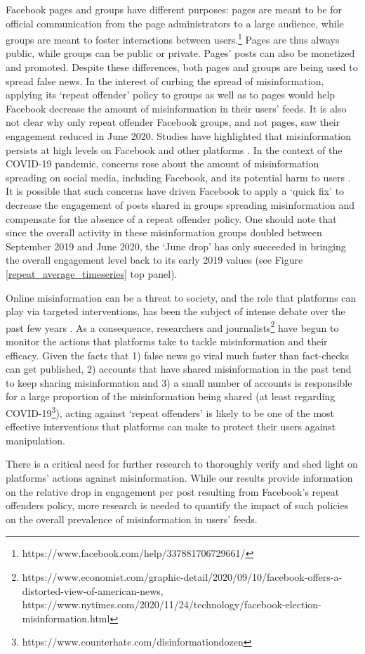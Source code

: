 \documentclass[11pt,a4paper]{article}
\begin{document}
Facebook pages and groups have different purposes: pages are meant to be for official communication from the page administrators to a large audience, while groups are meant to foster interactions between users.\footnote{https://www.facebook.com/help/337881706729661/} 
Pages are thus always public, while groups can be public or private.
Pages' posts can also be monetized and promoted.
Despite these differences, both pages and groups are being used to spread false news. 
In the interest of curbing the spread of misinformation, applying its `repeat offender' policy to groups as well as to pages would help Facebook decrease the amount of misinformation in their users’ feeds. 
It is also not clear why only repeat offender Facebook groups, and not pages, saw their engagement reduced in June 2020.
Studies have highlighted that misinformation persists at high levels on Facebook and other platforms \citep{kornbluh2020new, resnick2018iffy}.
In the context of the COVID-19 pandemic, concerns rose about the amount of misinformation spreading on social media, including Facebook, and its potential harm to users \citep{johnson2020online}.
It is possible that such concerns have driven Facebook to apply a `quick fix' to decrease the engagement of posts shared in groups spreading misinformation and compensate for the absence of a repeat offender policy.
One should note that since the overall activity in these misinformation groups doubled between September 2019 and June 2020, the `June drop' has only succeeded in bringing the overall engagement level back to its early 2019 values (see Figure \ref{repeat_average_timeseries} top panel).

Online misinformation can be a threat to society, and the role that platforms can play via targeted interventions, has been the subject of intense debate over the past few years \citep{rogers2020deplatforming, de2020internet}. 
As a consequence, researchers \citep{mena2020cleaning, yaqub2020effects} and journalists\footnote{https://www.economist.com/graphic-detail/2020/09/10/facebook-offers-a-distorted-view-of-american-news, https://www.nytimes.com/2020/11/24/technology/facebook-election-misinformation.html} have begun to monitor the actions that platforms take to tackle misinformation and their efficacy.
Given the facts that 1) false news go viral much faster than fact-checks can get published, 2) accounts that have shared misinformation in the past tend to keep sharing misinformation and 3) a small number of accounts is responsible for a large proportion of the misinformation being shared (at least regarding COVID-19\footnote{https://www.counterhate.com/disinformationdozen}), acting against `repeat offenders' is likely to be one of the most effective interventions that platforms can make to protect their users against manipulation.

There is a critical need for further research to thoroughly verify and shed light on platforms' actions against misinformation. 
While our results provide information on the relative drop in engagement per post resulting from Facebook’s repeat offenders policy, more research is needed to quantify the impact of such policies on the overall prevalence of misinformation in users’ feeds.
 


\end{document}
